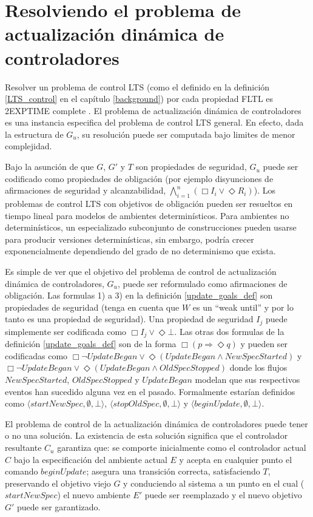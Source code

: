 \section{Resolviendo el problema de actualización dinámica de controladores}

Resolver un problema de control LTS (como el definido en la definición \ref{LTS_control} en el capítulo
\ref{background}) por cada propiedad FLTL es 2EXPTIME complete \cite{Pnueli:1989:SRM:75277.75293}. El problema de
actualización dinámica de controladores es una instancia especifica del problema de control LTS general. En efecto, dada
la estructura de $G_u$, su resolución puede ser computada bajo limites de menor complejidad.

Bajo la asunción de que $G$, $G'$ y $T$ son propiedades de seguridad, $G_u$ puede ser codificado como propiedades de
obligación (por ejemplo disyunciones de afirmaciones de seguridad y alcanzabilidad, $\bigwedge^n_{i=1}(\Box I_i \lor
\Diamond R_i)$). Los problemas de control LTS con objetivos de obligación pueden ser resueltos en tiempo lineal para
modelos de ambientes determinísticos. Para ambientes no determinísticos, un especializado subconjunto de construcciones
pueden usarse para producir versiones determinísticas, sin embargo, podría crecer exponencialmente dependiendo del grado
de no determinismo que exista.

Es simple de ver que el objetivo del problema de control de actualización dinámica de controladores, $G_u$, puede ser
reformulado como afirmaciones de obligación. Las formulas 1) a 3) en la definición \ref{update_goals_def} son propiedades
de seguridad (tenga en cuenta que $W$ es un ``weak until'' y por lo tanto es una propiedad de seguridad). Una propiedad
de seguridad $I_j$ puede simplemente ser codificada como $\Box I_j \lor \Diamond \bot$. Las otras dos formulas de la
definición \ref{update_goals_def} son de la forma $\Box(p \Longrightarrow \Diamond q)$ y pueden ser codificadas como
$\Box \neg UpdateBegan \lor \Diamond (UpdateBegan \wedge NewSpecStarted)$ y $\Box \neg UpdateBegan \lor \Diamond
(UpdateBegan \wedge OldSpecStopped)$ donde los flujos $NewSpecStarted$, $OldSpecStopped$ y $UpdateBegan$ modelan que sus
respectivos eventos han sucedido alguna vez en el pasado. Formalmente estarían definidos como $\langle{startNewSpec},
\emptyset, \bot \rangle$, $\langle{stopOldSpec}, \emptyset, \bot \rangle$ y $\langle{beginUpdate}, \emptyset, \bot
\rangle$.

El problema de control de la actualización dinámica de controladores puede tener o no una solución. La existencia de 
esta solución significa que el controlador resultante $C_u$ garantiza que: se comporte inicialmente como el controlador
actual $C$ bajo la especificación del ambiente actual $E$ y acepta en cualquier punto el comando $beginUpdate$; asegura
una transición correcta, satisfaciendo $T$, preservando el objetivo viejo $G$ y conduciendo al sistema a un punto en el
cual ($startNewSpec$) el nuevo ambiente $E'$ puede ser reemplazado y el nuevo objetivo $G'$ puede ser garantizado.

